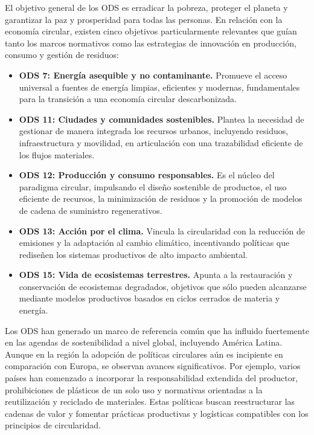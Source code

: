 
El objetivo general de los ODS es erradicar la pobreza, proteger el planeta y garantizar la paz y prosperidad para todas las personas. En relación con la economía circular, existen cinco objetivos particularmente relevantes que guían tanto los marcos normativos como las estrategias de innovación en producción, consumo y gestión de residuos:

\begin{itemize}
\item \textbf{ODS 7: Energía asequible y no contaminante.} Promueve el acceso universal a fuentes de energía limpias, eficientes y modernas, fundamentales para la transición a una economía circular descarbonizada.
\item \textbf{ODS 11: Ciudades y comunidades sostenibles.} Plantea la necesidad de gestionar de manera integrada los recursos urbanos, incluyendo residuos, infraestructura y movilidad, en articulación con una trazabilidad eficiente de los flujos materiales.
\item \textbf{ODS 12: Producción y consumo responsables.} Es el núcleo del paradigma circular, impulsando el diseño sostenible de productos, el uso eficiente de recursos, la minimización de residuos y la promoción de modelos de cadena de suministro regenerativos.
\item \textbf{ODS 13: Acción por el clima.} Vincula la circularidad con la reducción de emisiones y la adaptación al cambio climático, incentivando políticas que rediseñen los sistemas productivos de alto impacto ambiental.
\item \textbf{ODS 15: Vida de ecosistemas terrestres.} Apunta a la restauración y conservación de ecosistemas degradados, objetivos que sólo pueden alcanzarse mediante modelos productivos basados en ciclos cerrados de materia y energía.
\end{itemize}

Los ODS han generado un marco de referencia común que ha influido fuertemente en las agendas de sostenibilidad a nivel global, incluyendo América Latina. Aunque en la región la adopción de políticas circulares aún es incipiente en comparación con Europa, se observan avances significativos. Por ejemplo, varios países han comenzado a incorporar la responsabilidad extendida del productor, prohibiciones de plásticos de un solo uso y normativas orientadas a la reutilización y reciclado de materiales. Estas políticas buscan reestructurar las cadenas de valor y fomentar prácticas productivas y logísticas compatibles con los principios de circularidad.

